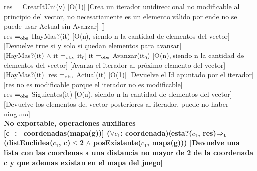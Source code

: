 {res = CrearItUni(v)}
[O(1)]
[Crea un iterador unidireccional no modificable al principio del vector, no necesariamente es un elemento válido por ende no se puede usar Actual sin Avanzar]
[]\\

{res $=_{\mathrm{obs}}$ HayMas?(it)}
[O(n), siendo n la cantidad de elementos del vector]
[Devuelve true si y solo si quedan elementos para avanzar]\\

[HayMas?(it) $\wedge$ it $=_{\mathrm{obs}}$ it$_0$]
{it $=_{\mathrm{obs}}$ Avanzar(it$_0$)}
[O(n), siendo n la cantidad de elementos del vector]
[Avanza el iterador al próximo elemento del vector]\\

[HayMas?(it)]
{res $=_{\mathrm{obs}}$ Actual(it)}
[O(1)]
[Devuelve el Id apuntado por el iterador]
[res no es modificable porque el iterador no es modificable]\\

{res $=_{\mathrm{obs}}$ Siguientes(it)}
[O(n), siendo n la cantidad de elementos del vector]
[Devuelve los elementos del vector posteriores al iterador, puede no haber ninguno]\\

\bf{No exportable, operaciones auxiliares}\\

[c $\in$ coordenadas(mapa(g))]
{($\forall c_1$: coordenada)(esta?($c_1$, res)$\Rightarrow_{\mathrm{\scriptscriptstyle{L}}}$(distEuclidea($c_1$, c)$\leq$2  $\wedge$ posExistente($c_1$, mapa(g)))}
[Devuelve una lista con las coordenas a una distancia no mayor de 2 de la coordenada c y que ademas existan en el mapa del juego]

